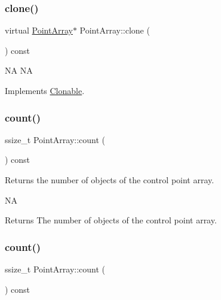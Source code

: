 \mbox{\label{classPointArray_a00e2c9e6258f31e6b063825ea1eecf7c}} 
\subsubsection{\texorpdfstring{clone()}{clone()}\hspace{0.1cm}{\footnotesize\ttfamily [2/2]}}
{\footnotesize\ttfamily virtual \hyperlink{classPointArray}{Point\+Array}$\ast$ Point\+Array\+::clone (\begin{DoxyParamCaption}{ }\end{DoxyParamCaption}) const\hspace{0.3cm}{\ttfamily [virtual]}}

NA  NA 

Implements \hyperlink{classClonable_a36b05a0fa605f4f269e5884bde7f9e0c}{Clonable}.

\mbox{\label{classPointArray_acb504dfc029d3437c570c88712d704b2}} 
\subsubsection{\texorpdfstring{count()}{count()}\hspace{0.1cm}{\footnotesize\ttfamily [1/2]}}
{\footnotesize\ttfamily ssize\+\_\+t Point\+Array\+::count (\begin{DoxyParamCaption}{ }\end{DoxyParamCaption}) const}

Returns the number of objects of the control point array.

NA \begin{DoxyReturn}{Returns}
The number of objects of the control point array. 
\end{DoxyReturn}
\mbox{\label{classPointArray_acb504dfc029d3437c570c88712d704b2}} 
\subsubsection{\texorpdfstring{count()}{count()}\hspace{0.1cm}{\footnotesize\ttfamily [2/2]}}
{\footnotesize\ttfamily ssize\+\_\+t Point\+Array\+::count (\begin{DoxyParamCaption}{ }\end{DoxyParamCaption}) const}

